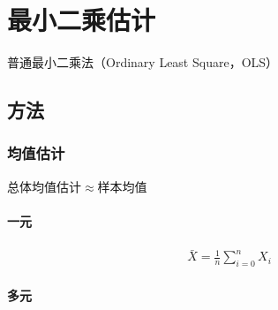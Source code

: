 \documentclass[12pt]{book}
\begin{document}
\section{最小二乘估计}





普通最小二乘法（Ordinary Least Square，OLS）

\subsection{方法}

\subsubsection{均值估计}
总体均值估计$\approx$样本均值

\paragraph{一元}

\begin{gather*}
    \bar{X}=\frac{1}{n}\sum_{i=0}^{n}X_i
\end{gather*}



\paragraph{多元}
\end{document}
